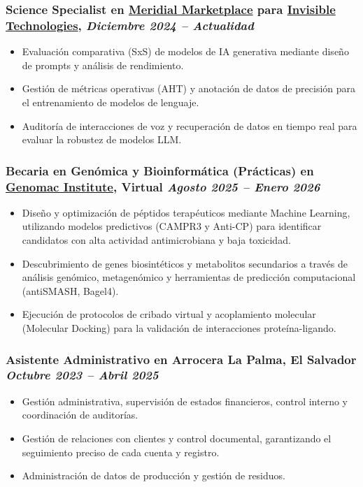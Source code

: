 \documentclass[a4paper,10pt]{article}
\begin{document}
\subsubsection*{%
  \textbf{Science Specialist} en \href{https://www.linkedin.com/company/meridial-marketplace}{Meridial Marketplace} para \href{https://www.linkedin.com/company/invisible-technologies-inc-/}{Invisible Technologies},
  \hfill
  \textit{Diciembre 2024 -- Actualidad}
}
\begin{itemize}
  \item Evaluación comparativa (SxS) de modelos de IA generativa mediante diseño de prompts y análisis de rendimiento.
  \item Gestión de métricas operativas (AHT) y anotación de datos de precisión para el entrenamiento de modelos de lenguaje.
  \item Auditoría de interacciones de voz y recuperación de datos en tiempo real para evaluar la robustez de modelos LLM.
\end{itemize}

\subsubsection*{%
  \textbf{Becaria en Genómica y Bioinformática (Prácticas)} en \href{https://www.linkedin.com/company/genomics-research-center-genomac-hub/posts/?feedView=all}{Genomac Institute}, Virtual
  \hfill
  \textit{Agosto 2025 -- Enero 2026}
}
\begin{itemize}
  \item Diseño y optimización de péptidos terapéuticos mediante Machine Learning, utilizando modelos predictivos (CAMPR3 y Anti-CP) para identificar candidatos con alta actividad antimicrobiana y baja toxicidad.
  \item Descubrimiento de genes biosintéticos y metabolitos secundarios a través de análisis genómico, metagenómico y herramientas de predicción computacional (antiSMASH, Bagel4).
  \item Ejecución de protocolos de cribado virtual y acoplamiento molecular (Molecular Docking) para la validación de interacciones proteína-ligando.
\end{itemize}

\subsubsection*{%
  \textbf{Asistente Administrativo} en Arrocera La Palma, El Salvador
  \hfill
  \textit{Octubre 2023 -- Abril 2025}
}
\begin{itemize}
  \item Gestión administrativa, supervisión de estados financieros, control interno y coordinación de auditorías.
  \item Gestión de relaciones con clientes y control documental, garantizando el seguimiento preciso de cada cuenta y registro.
  \item Administración de datos de producción y gestión de residuos. 
\end{itemize}
\end{document}
